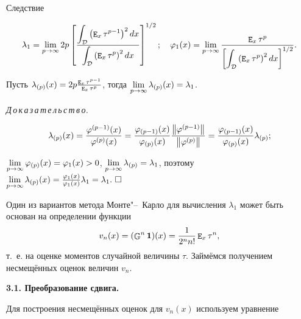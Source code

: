 \begin{newthm}{Следствие}

    \[

        \lambda_1=\llim_{p\to\infty}2p\left[\frac{\displaystyle\int_{\D}\left(\expect_x\tau^{p-1}\right)^2dx}{\displaystyle\int_{\D}\left(\expect_x\tau^p\right)^2dx}\right]^{1/2};\quad \varphi_1(x)=\llim_{p\to\infty}\frac{\expect_x\tau^p}

{\left[\displaystyle\int_{\D}\left(\expect_x\tau^p\right)^2dx\right]^{1/2}}.

    \]

\end{newthm}



\begin{lemma}{}

    Пусть $\lambda_{(p)}(x)=2p\frac{\mathop{\tt E}\nolimits_x\tau^{p-1}}{\mathop{\tt E}\nolimits_x\tau^p}${\rm ,} тогда $\lim\limits_{p\to\infty}\lambda_{(p)}(x)=\lambda_1${\rm .}

\end{lemma}



{\it Д\,о\,к\,а\,з\,а\,т\,е\,л\,ь\,с\,т\,в\,о.}

    \[      \lambda_{(p)}(x)=\frac{\varphi^{(p-1)}(x)}{\varphi^{(p)}(x)}=\frac{\varphi_{(p-1)}(x)}{\varphi_{(p)}(x)}\frac{\norm{\varphi^{(p-1)}}}{\norm{\varphi^{(p)}}}=\frac{\varphi_{(p-1)}(x)}{\varphi_{(p)}(x)}\lambda_{(p)};

    \]

    $\lim\limits_{p\to\infty}\varphi_{(p)}(x)=\varphi_1(x)>0$, $\lim\limits_{p\to\infty}\lambda_{(p)}=\lambda_1$, поэтому $\lim\limits_{p\to\infty}\lambda_{(p)}(x)=\frac{\varphi_1(x)}{\varphi_1(x)}\lambda_1=\lambda_1.~\square $





\smallskip


    Один из вариантов метода Монте"--~Карло для вычисления $\lambda_1$ может быть основан на определении функции $$v_n(x)=(\mathop{\mathbb{G}}\nolimits^n\mathbf{1})(x)=\frac{1}{2^nn!}\mathop{\tt E}\nolimits_x\tau^n,$$ т.~е. на оценке моментов случайной величины $\tau$. Займёмся получением несмещённых оценок величин $v_n$.

    

    \smallskip



{\bf 3.1. Преобразование сдвига.}

    Для построения несмещённых оценок для $v_n(x)$ используем уравнение

